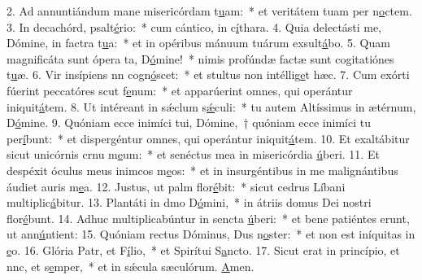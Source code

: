 2. Ad annuntiándum mane misericórdam t\uline{u}am:~* et veritátem tuam per n\uline{o}ctem.
3. In decachórd, psalt\uline{é}rio:~* cum cántico, in c\uline{í}thara.
4. Quia delectásti me, Dómine, in factra t\uline{u}a:~* et in opéribus mánuum tuárum exsult\uline{á}bo.
5. Quam magnificáta sunt ópera ta, D\uline{ó}mine!~* nimis profúndæ factæ sunt cogitatiónes t\uline{u}æ.
6. Vir insípiens nn cogn\uline{ó}scet:~* et stultus non intéllig\uline{e}t hæc.
7. Cum exórti fúerint peccatóres scut f\uline{e}num:~* et apparúerint omnes, qui operántur iniquit\uline{á}tem.
8. Ut intéreant in sǽclum s\uline{ǽ}culi:~* tu autem Altíssimus in ætérnum, D\uline{ó}mine.
9. Quóniam ecce inimíci tui, Dómine,~† quóniam ecce inimíci tu per\uline{í}bunt:~* et dispergéntur omnes, qui operántur iniquit\uline{á}tem.
10. Et exaltábitur sicut unicórnis crnu m\uline{e}um:~* et senéctus mea in misericórdia \uline{ú}beri.
11. Et despéxit óculus meus inimcos m\uline{e}os:~* et in insurgéntibus in me malignántibus áudiet auris m\uline{e}a.
12. Justus, ut palm flor\uline{é}bit:~* sicut cedrus Líbani multiplic\uline{á}bitur.
13. Plantáti in dmo D\uline{ó}mini,~* in átriis domus Dei nostri flor\uline{é}bunt.
14. Adhuc multiplicabúntur in sencta \uline{ú}beri:~* et bene patiéntes erunt, ut ann\uline{ú}ntient:
15. Quóniam rectus Dóminus, Dus n\uline{o}ster:~* et non est iníquitas in \uline{e}o.
16. Glória Patr, et F\uline{í}lio,~* et Spirítui S\uline{a}ncto.
17. Sicut erat in princípio, et nnc, et s\uline{e}mper,~* et in sǽcula sæculórum. \uline{A}men.
